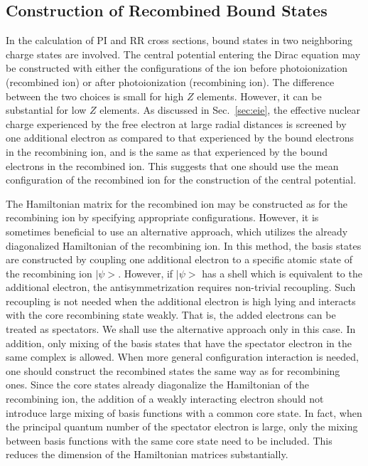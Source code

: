 \subsection{Construction of Recombined Bound States}
In the calculation of PI and RR cross sections, bound states in two
neighboring charge 
states are involved. The central potential entering the Dirac equation may be
constructed with either the configurations of the ion before photoionization
(recombined ion) or after photoionization (recombining ion). The difference
between the two choices is small for high $Z$ elements. However, it can be
substantial for low $Z$ elements. As discussed in Sec.~\ref{sec:eie}, the
effective nuclear charge experienced by the free electron at large radial
distances is screened by one additional electron as compared to that
experienced by the bound electrons in the
recombining ion, and is the same as that experienced by the bound electrons in
the recombined ion. This suggests that
one should use the mean configuration of the recombined ion for the
construction of the central potential. 

The Hamiltonian matrix for the recombined ion may be constructed as for the
recombining ion by specifying appropriate configurations. However, it is
sometimes beneficial to use an alternative approach, which utilizes the already
diagonalized Hamiltonian of the recombining ion. In this method, the basis
states are constructed by coupling one additional electron to a specific
atomic state 
of the recombining ion $|\psi>$. However, if $|\psi>$ has a shell which is
equivalent to the additional electron, the antisymmetrization requires
non-trivial recoupling. Such recoupling is not needed when the additional
electron is high lying and interacts with the core recombining state
weakly. That is, the added electrons can be treated as spectators. We shall use
the alternative approach only in this case. In addition, only 
mixing of the basis states that have the spectator electron in the same
complex is 
allowed. When more general configuration interaction is needed, one should
construct the recombined states the same way as for recombining ones.
Since the core states already diagonalize the Hamiltonian of the
recombining ion, the addition of a weakly interacting electron should not
introduce large mixing of basis functions with a common core state. In fact,
when the 
principal quantum number of the spectator electron is large, only the mixing
between basis functions with the same core state need to be included. This
reduces the dimension of the Hamiltonian matrices substantially. 


